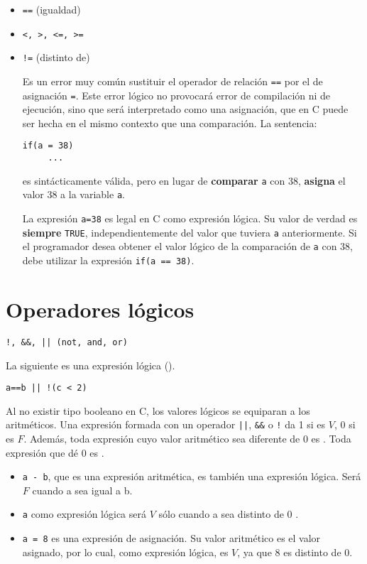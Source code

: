 \begin{itemize}
\item \lstinline{==} (igualdad)
\item \lstinline{<, >, <=, >=}
\item \lstinline{!=} (distinto de)

Es un error muy común sustituir el operador de relación \lstinline{==} por el de asignación \lstinline{=}. Este error lógico no provocará error de compilación ni de ejecución, sino que será interpretado como una asignación, que en C puede ser hecha en el mismo contexto que una comparación. La sentencia:
\begin{lstlisting}
if(a = 38)
     ...
\end{lstlisting}     
es sintácticamente válida, pero en lugar de \textbf{comparar} \lstinline{a} con 38, \textbf{asigna} el valor 38 a la variable \lstinline{a}. 

La expresión \lstinline{a=38} es legal en C como expresión lógica. Su valor de verdad es \textbf{siempre} \lstinline{TRUE}, independientemente del valor que tuviera \lstinline{a} anteriormente. Si el programador desea obtener el valor lógico de la comparación de \lstinline{a} con 38, debe utilizar la expresión \lstinline{if(a == 38)}.
\end{itemize}


\section{Operadores lógicos}
\begin{lstlisting}
!, &&, || (not, and, or)	
\end{lstlisting}

\begin{ejemplo}
La siguiente es una expresión lógica ().
\begin{lstlisting}
a==b || !(c < 2)    
\end{lstlisting}
\end{ejemplo}

Al no existir tipo booleano en C, los valores lógicos se equiparan a los aritméticos. Una expresión formada con un operador \lstinline{||}, \lstinline{&&} o \lstinline{!} da 1 si es $V$, 0 si es $F$. Además, toda expresión cuyo valor aritmético sea diferente de 0 es . Toda expresión que dé 0 es .

\begin{ejemplo}
\noindent
\begin{itemize}
\item \lstinline{a - b}, que es una expresión aritmética, es también una expresión lógica. Será $F$ cuando a sea igual a b.
\item \lstinline{a} como expresión lógica será $V$ sólo cuando a sea distinto de 0 .

\item \lstinline{a = 8} es una expresión de asignación. Su valor aritmético es el valor asignado, por lo cual, como expresión lógica, es $V$, ya que 8 es distinto de 0.

\end{itemize}
\end{ejemplo}

